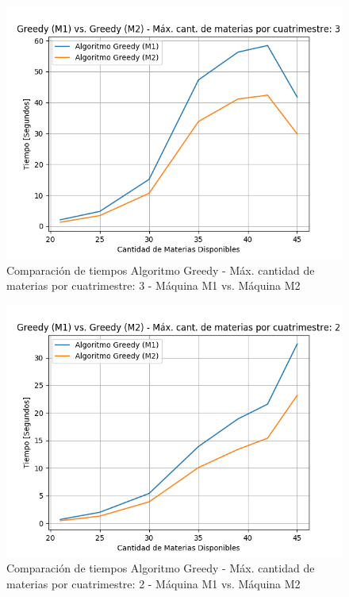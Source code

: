 \documentclass[a4paper]{article}
\begin{document}
\begin{figure}[H]
\centering
\includegraphics[scale=0.65]{Imagenes/m1_vs_m2_GREEDY_max_mat_3.png}\par
\caption{Comparación de tiempos Algoritmo Greedy - Máx. cantidad de materias por cuatrimestre: 3 - Máquina M1 vs. Máquina M2}
\end{figure}

\begin{figure}[H]
\centering
\includegraphics[scale=0.65]{Imagenes/m1_vs_m2_GREEDY_max_mat_2.png}\par
\caption{Comparación de tiempos Algoritmo Greedy - Máx. cantidad de materias por cuatrimestre: 2 - Máquina M1 vs. Máquina M2}
\end{figure}
\end{document}
